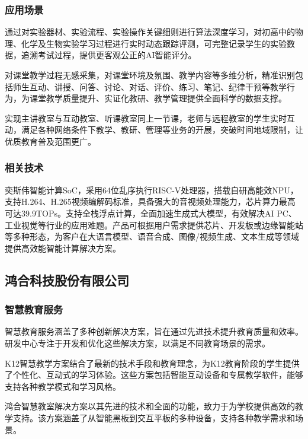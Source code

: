 \subsubsection{应用场景}

通过对实验器材、实验流程、实验操作关键细则进行算法深度学习，对初高中的物理、化学及生物实验学习过程进行实时动态跟踪评测，可完整记录学生的实验数据，追溯考试过程，提供更客观公正的AI智能评分。

对课堂教学过程无感采集，对课堂环境及氛围、教学内容等多维分析，精准识别包括师生互动、讲授、问答、讨论、对话、评价、练习、笔记、纪律干预等教学行为，为课堂教学质量提升、实证化教研、教学管理提供全面科学的数据支撑。

实现主讲教室与互动教室、听课教室同上一节课，老师与远程教室的学生实时互动，满足各种网络条件下教学、教研、管理等业务的开展，突破时间地域限制，让优质教育普及范围更广。

\subsubsection{相关技术}

奕斯伟智能计算SoC，采用64位乱序执行RISC-V处理器，搭载自研高能效NPU，支持H.264、H.265视频编解码标准，具备强大的音视频处理能力，芯片算力最高可达39.9TOPs。支持全栈浮点计算，全面加速生成式大模型，有效解决AI PC、工业视觉等行业的应用难题。产品可根据用户需求提供芯片、开发板或边缘智能站等多种形态，为客户在大语言模型、语音合成、图像/视频生成、文本生成等领域提供高效能智能计算解决方案。


\subsection{鸿合科技股份有限公司}

\subsubsection{智慧教育服务}
智慧教育服务涵盖了多种创新解决方案，旨在通过先进技术提升教育质量和效率。研发中心专注于开发和优化这些解决方案，以满足不同教育场景的需求。

K12智慧教学方案结合了最新的技术手段和教育理念，为K12教育阶段的学生提供了个性化、互动式的学习体验。这些方案包括智能互动设备和专属教学软件，能够支持各种教学模式和学习风格。

鸿合智慧教室解决方案以其先进的技术和全面的功能，致力于为学校提供高效的教学支持。该方案涵盖了从智能黑板到交互平板的多种设备，支持各种教学需求和场景。

